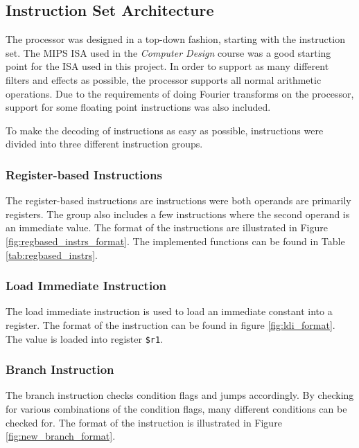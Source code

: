 \subsection{Instruction Set Architecture}\label{section:fpga-isa}

The processor was designed in a top-down fashion, starting with the instruction
set. The MIPS ISA used in the \textit{Computer
Design}\cite{tdt4255} course was a good starting point for the ISA used in this
project. In order to support as many different filters
and effects as possible, the processor supports all normal arithmetic
operations. Due to the requirements of doing Fourier transforms on the
processor, support for some floating point instructions was also included.

To make the decoding of instructions as easy as possible, instructions
were divided into three different instruction groups.

\subsubsection{Register-based Instructions}

The register-based instructions are instructions were both operands are
primarily registers. The group also includes a few instructions where
the second operand is an immediate value. The format of the
instructions are illustrated in Figure \ref{fig:regbased_instrs_format}. The
implemented functions can be found in Table \ref{tab:regbased_instrs}.


\FloatBarrier

\FloatBarrier

\subsubsection{Load Immediate Instruction}
The load immediate instruction is used to load an immediate constant into a
register. The format of the instruction can be found in figure
\ref{fig:ldi_format}. The value is loaded into register \texttt{\$r1}.


\FloatBarrier

\subsubsection{Branch Instruction}
The branch instruction checks condition flags and jumps accordingly. By
checking for various combinations of the condition flags, many different
conditions can be checked for. The format of the instruction is illustrated
in Figure \ref{fig:new_branch_format}.

